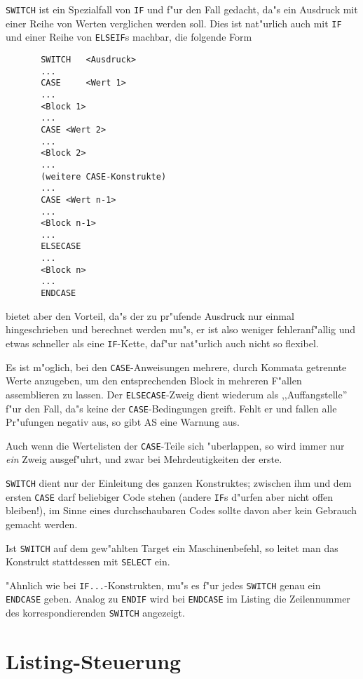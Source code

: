 \documentclass[12pt,a4paper,twoside]{report}
\newcommand{\ii}[1]{{\it #1}}
\newcommand{\tty}[1]{{\tt #1}}
\begin{document}
\tty{SWITCH} ist ein Spezialfall von \tty{IF} und f"ur den Fall gedacht, da"s ein
Ausdruck mit einer Reihe von Werten verglichen werden soll.  Dies ist
nat"urlich auch mit \tty{IF} und einer Reihe von \tty{ELSEIF}s machbar, die folgende
Form
\begin{verbatim}
       SWITCH   <Ausdruck>
       ...
       CASE     <Wert 1>
       ...
       <Block 1>
       ...
       CASE <Wert 2>
       ...
       <Block 2>
       ...
       (weitere CASE-Konstrukte)
       ...
       CASE <Wert n-1>
       ...
       <Block n-1>
       ...
       ELSECASE
       ...
       <Block n>
       ...
       ENDCASE
\end{verbatim}
bietet aber den Vorteil, da"s der zu pr"ufende Ausdruck nur einmal hingeschrieben
und berechnet werden mu"s, er ist also weniger fehleranf"allig und etwas
schneller als eine \tty{IF}-Kette, daf"ur nat"urlich auch nicht so flexibel.
\par
Es ist m"oglich, bei den \tty{CASE}-Anweisungen mehrere, durch Kommata getrennte
Werte anzugeben, um den entsprechenden Block in mehreren F"allen assemblieren
zu lassen.  Der \tty{ELSECASE}-Zweig dient wiederum als ,,Auffangstelle'' f"ur den
Fall, da"s keine der \tty{CASE}-Bedingungen greift.  Fehlt er und fallen alle
Pr"ufungen negativ aus, so gibt AS eine Warnung aus.
\par
Auch wenn die Wertelisten der \tty{CASE}-Teile sich "uberlappen, so wird immer
nur \ii{ein} Zweig ausgef"uhrt, und zwar bei Mehrdeutigkeiten der erste.
\par
\tty{SWITCH} dient nur der Einleitung des ganzen Konstruktes; zwischen ihm und
dem ersten \tty{CASE} darf beliebiger Code stehen (andere \tty{IF}s d"urfen aber nicht
offen bleiben!), im Sinne eines durchschaubaren Codes sollte davon aber
kein Gebrauch gemacht werden.
\par
Ist \tty{SWITCH} auf dem gew"ahlten Target ein Maschinenbefehl,
so leitet man das Konstrukt stattdessen mit \tty{SELECT} ein.
\par
"Ahnlich wie bei {\tt IF...}-Konstrukten, mu"s es f"ur jedes {\tt SWITCH}
genau ein {\tt ENDCASE} geben.  Analog zu {\tt ENDIF} wird bei {\tt ENDCASE}
im Listing die Zeilennummer des korrespondierenden {\tt SWITCH} angezeigt.


\section{Listing-Steuerung}
\end{document}
